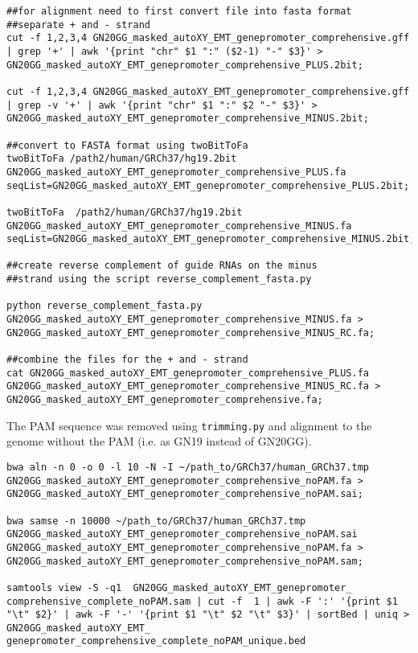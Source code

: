 \begin{small}\begin{lstlisting}
##for alignment need to first convert file into fasta format
##separate + and - strand
cut -f 1,2,3,4 GN20GG_masked_autoXY_EMT_genepromoter_comprehensive.gff | grep '+' | awk '{print "chr" $1 ":" ($2-1) "-" $3}' > GN20GG_masked_autoXY_EMT_genepromoter_comprehensive_PLUS.2bit;

cut -f 1,2,3,4 GN20GG_masked_autoXY_EMT_genepromoter_comprehensive.gff | grep -v '+' | awk '{print "chr" $1 ":" $2 "-" $3}' > GN20GG_masked_autoXY_EMT_genepromoter_comprehensive_MINUS.2bit;

##convert to FASTA format using twoBitToFa
twoBitToFa /path2/human/GRCh37/hg19.2bit GN20GG_masked_autoXY_EMT_genepromoter_comprehensive_PLUS.fa seqList=GN20GG_masked_autoXY_EMT_genepromoter_comprehensive_PLUS.2bit;

twoBitToFa  /path2/human/GRCh37/hg19.2bit GN20GG_masked_autoXY_EMT_genepromoter_comprehensive_MINUS.fa seqList=GN20GG_masked_autoXY_EMT_genepromoter_comprehensive_MINUS.2bit;

##create reverse complement of guide RNAs on the minus
##strand using the script reverse_complement_fasta.py

python reverse_complement_fasta.py GN20GG_masked_autoXY_EMT_genepromoter_comprehensive_MINUS.fa > GN20GG_masked_autoXY_EMT_genepromoter_comprehensive_MINUS_RC.fa;

##combine the files for the + and - strand
cat GN20GG_masked_autoXY_EMT_genepromoter_comprehensive_PLUS.fa GN20GG_masked_autoXY_EMT_genepromoter_comprehensive_MINUS_RC.fa > GN20GG_masked_autoXY_EMT_genepromoter_comprehensive.fa;
\end{lstlisting}\end{small}

The PAM sequence was removed using \verb|trimming.py| and alignment to the genome without the PAM (i.e. as GN19 instead of GN20GG).

\begin{small}\begin{lstlisting}
bwa aln -n 0 -o 0 -l 10 -N -I ~/path_to/GRCh37/human_GRCh37.tmp
GN20GG_masked_autoXY_EMT_genepromoter_comprehensive_noPAM.fa >
GN20GG_masked_autoXY_EMT_genepromoter_comprehensive_noPAM.sai;

bwa samse -n 10000 ~/path_to/GRCh37/human_GRCh37.tmp   
GN20GG_masked_autoXY_EMT_genepromoter_comprehensive_noPAM.sai 
GN20GG_masked_autoXY_EMT_genepromoter_comprehensive_noPAM.fa > 
GN20GG_masked_autoXY_EMT_genepromoter_comprehensive_noPAM.sam;

samtools view -S -q1  GN20GG_masked_autoXY_EMT_genepromoter_
comprehensive_complete_noPAM.sam | cut -f  1 | awk -F ':' '{print $1 "\t" $2}' | awk -F '-' '{print $1 "\t" $2 "\t" $3}' | sortBed | uniq > GN20GG_masked_autoXY_EMT_
genepromoter_comprehensive_complete_noPAM_unique.bed
\end{lstlisting}\end{small}

